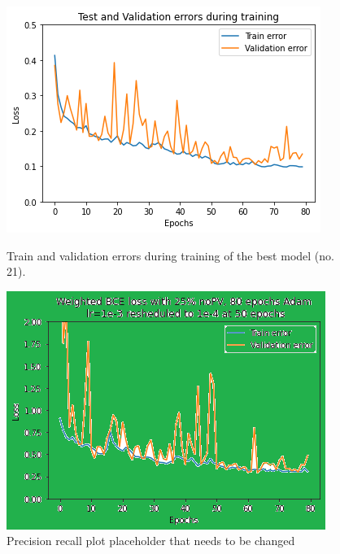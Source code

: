 \documentclass[10pt,conference]{IEEEtran}
\begin{document}
\begin{figure}
\centering
    \begin{minipage}[b]{.45\columnwidth}
        \includegraphics[width=\columnwidth]{report/images/train_validation_errors.png}
        \caption{Train and validation errors during training of the best model (no. 21).}
        \label{fig:train_validation_errors}
    \end{minipage}\quad
    \begin{minipage}[b]{.45\columnwidth}
        \includegraphics[width=\columnwidth]{report/images/placeholder_precision_recall.png}
        \caption{Precision recall plot placeholder that needs to be changed}
        \label{fig:precision_recall}
    \end{minipage}
\end{figure}
\end{document}
